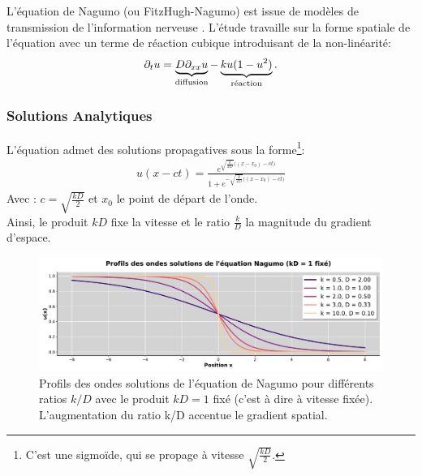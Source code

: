\label{par:analyser_operateurs_nagumo}
L'équation de Nagumo (ou FitzHugh-Nagumo) est issue de modèles de transmission de l'information nerveuse \cite{FITZHUGH1961445}.
L'étude travaille sur la forme spatiale de l'équation \cite{keener1998mathematical} avec un terme de réaction cubique introduisant de la non-linéarité:
\begin{align}
    \partial_t u = \underbrace{D \partial_{xx} u}_{\text{diffusion}}
            - \underbrace{ku(1-u^2)}_{\text{réaction}}.
\end{align}
\subsubsection{Solutions Analytiques}\label{par:sloutions_nagumo}
L'équation admet des solutions propagatives sous la forme\footnote{C'est une sigmoïde, qui se propage à vitesse $\sqrt{\frac{kD}{2}}$.}:%
\begin{align}
    \label{eq:sol_nagumo}
    u(x-ct) = \frac{e^{
        \sqrt{\frac{k}{2D}} \bigl((x-x_0) - ct \bigr)}
    }
    {1 + e^{
        -\sqrt{\frac{k}{2D}} \bigl((x-x_0) - ct \bigr)}
    }
\end{align}
Avec : $c = \sqrt{\frac{kD}{2}}$ et $x_0$ le point de départ de l'onde.\\
Ainsi, le produit $kD$ fixe la vitesse et le ratio $\frac{k}{D}$ la magnitude du gradient d'espace.

\begin{figure}[htbp]
    \centering
    \includegraphics[width=\textwidth]{media/4_travail/2_nagumo/profils_nagumo.pdf}
    \caption{Profils des ondes solutions de l'équation de Nagumo pour différents ratios $k/D$ avec le produit $kD = 1$ fixé (c'est à dire à vitesse fixée). L'augmentation du ratio k/D accentue le gradient spatial.}
    \label{fig:profils_nagumo}
\end{figure}


